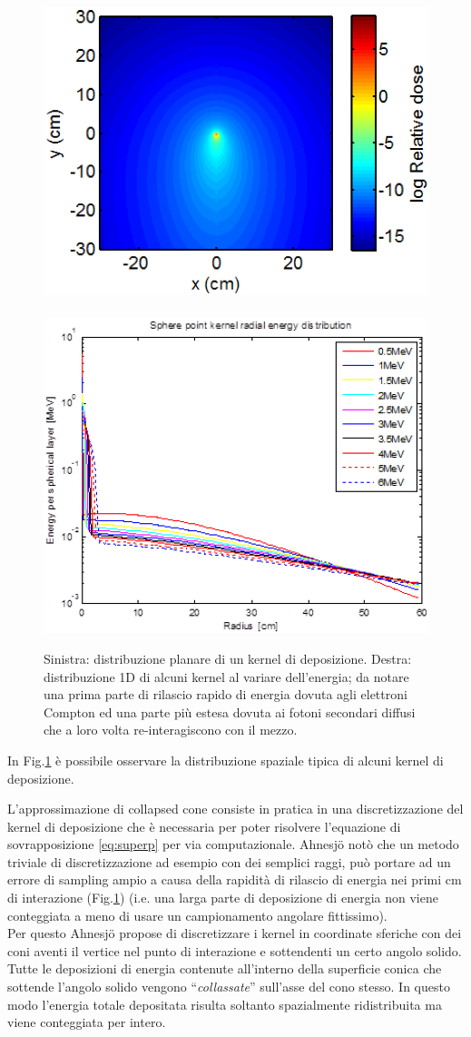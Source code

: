{\begin{figure}[!t]
\centering
\includegraphics[width=.45\textwidth]{./cap1/kern_ray1.png}$\quad$
\includegraphics[width=.45\textwidth]{./cap1/kern_ray2.png}
\caption{Sinistra: distribuzione planare di un kernel di deposizione. Destra: distribuzione 1D di alcuni kernel al variare dell'energia; da notare una prima parte di rilascio rapido di energia dovuta agli elettroni Compton ed una parte più estesa dovuta ai fotoni secondari diffusi che a loro volta re-interagiscono con il mezzo.}
\label{fig:kern_ray}
\end{figure}
In Fig.\ref{fig:kern_ray} è possibile osservare la distribuzione spaziale tipica di alcuni kernel di deposizione.

\vspace{.2cm}
L'approssimazione di collapsed cone consiste in pratica in una discretizzazione del kernel di deposizione che è necessaria per poter risolvere l'equazione di sovrapposizione \eqref{eq:superp} per via computazionale. Ahnesj\"{o} notò che un metodo triviale di discretizzazione ad esempio con dei semplici raggi, può portare ad un errore di sampling ampio a causa della rapidità di rilascio di energia nei primi cm di interazione \cite{Ahnesjo1989} (Fig.\ref{fig:kern_ray}) (i.e. una larga parte di deposizione di energia non viene conteggiata a meno di usare un campionamento angolare fittissimo).\\
Per questo Ahnesj\"{o} propose di discretizzare i kernel in coordinate sferiche con dei coni aventi il vertice nel punto di interazione e sottendenti un certo angolo solido. Tutte le deposizioni di energia contenute all'interno della superficie conica che sottende l'angolo solido vengono \textquotedblleft\textit{collassate}\textquotedblright{} sull'asse del cono stesso. In questo modo l'energia totale depositata risulta soltanto spazialmente ridistribuita ma viene conteggiata per intero.

}
